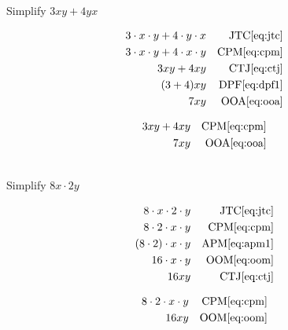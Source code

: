 \begin{example}[id:20141108-193835] \label{20141108-193835}  \hfill \\

Simplify $3xy + 4yx$

\soln

\solnsteps
\begin{align*}
3 \cdot x \cdot y + 4 \cdot y \cdot x && \text{JTC} \eqref{eq:jtc} \\
3 \cdot x \cdot y + 4 \cdot x \cdot y && \text{CPM} \eqref{eq:cpm} \\
3xy+4xy && \text{CTJ} \eqref{eq:ctj} \\
(3+4)xy && \text{DPF} \eqref{eq:dpf1} \\ 
7xy && \text{OOA} \eqref{eq:ooa} 
\end{align*}

\soln

\lesssteps
\begin{align*}
3xy + 4xy && \text{CPM} \eqref{eq:cpm} \\
7xy && \text{OOA} \eqref{eq:ooa} 
\end{align*}

\end{example}


\begin{example}[id:20141108-180100] \label{20141108-180100}  \hfill \\

Simplify $8x \cdot 2y$

\soln

\solnsteps
\begin{align*}
8 \cdot x \cdot 2 \cdot y && \text{JTC} \eqref{eq:jtc} \\
8 \cdot 2 \cdot x \cdot y && \text{CPM} \eqref{eq:cpm} \\
(8 \cdot 2) \cdot x \cdot y && \text{APM} \eqref{eq:apm1} \\
16 \cdot x \cdot y && \text{OOM} \eqref{eq:oom} \\
16 xy && \text{CTJ} \eqref{eq:ctj}  
\end{align*}

\soln

\lesssteps
\begin{align*}
8 \cdot 2 \cdot x \cdot y && \text{CPM} \eqref{eq:cpm} \\
16xy && \text{OOM} \eqref{eq:oom} 
\end{align*}

\end{example}

